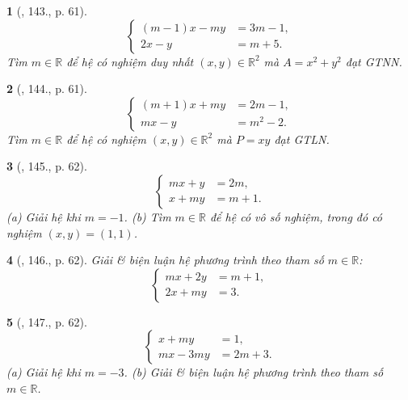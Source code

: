 \documentclass{article}
\newtheorem{baitoan}{}
\begin{document}
\begin{baitoan}[\cite{Dong_23_1001_toan_I}, 143., p. 61]
	\begin{equation*}
		\left\{\begin{split}
			(m - 1)x - my &= 3m - 1,\\
			2x - y &= m + 5.
		\end{split}\right.
	\end{equation*}
	Tìm $m\in\mathbb{R}$ để hệ có nghiệm duy nhất $(x,y)\in\mathbb{R}^2$ mà $A = x^2 + y^2$ đạt {\rm GTNN}.
\end{baitoan}

\begin{baitoan}[\cite{Dong_23_1001_toan_I}, 144., p. 61]
	\begin{equation*}
		\left\{\begin{split}
			(m + 1)x + my &= 2m - 1,\\
			mx - y &= m^2 - 2.
		\end{split}\right.
	\end{equation*}
	Tìm $m\in\mathbb{R}$ để hệ có nghiệm $(x,y)\in\mathbb{R}^2$ mà $P = xy$ đạt {\rm GTLN}.
\end{baitoan}

\begin{baitoan}[\cite{Dong_23_1001_toan_I}, 145., p. 62]
	\begin{equation*}
		\left\{\begin{split}
			mx + y &= 2m,\\
			x + my &= m + 1.
		\end{split}\right.
	\end{equation*}
	(a) Giải hệ khi $m = -1$. (b) Tìm $m\in\mathbb{R}$ để hệ có vô số nghiệm, trong đó có nghiệm $(x,y) = (1,1)$.
\end{baitoan}

\begin{baitoan}[\cite{Dong_23_1001_toan_I}, 146., p. 62]
	Giải \& biện luận hệ phương trình theo tham số $m\in\mathbb{R}$:
	\begin{equation*}
		\left\{\begin{split}
			mx + 2y &= m + 1,\\
			2x + my &= 3.
		\end{split}\right.
	\end{equation*}
\end{baitoan}

\begin{baitoan}[\cite{Dong_23_1001_toan_I}, 147., p. 62]
	\begin{equation*}
		\left\{\begin{split}
			x + my &= 1,\\
			mx - 3my &= 2m + 3.
		\end{split}\right.
	\end{equation*}
	(a) Giải hệ khi $m = -3$. (b) Giải \& biện luận hệ phương trình theo tham số $m\in\mathbb{R}$.
\end{baitoan}
\end{document}
